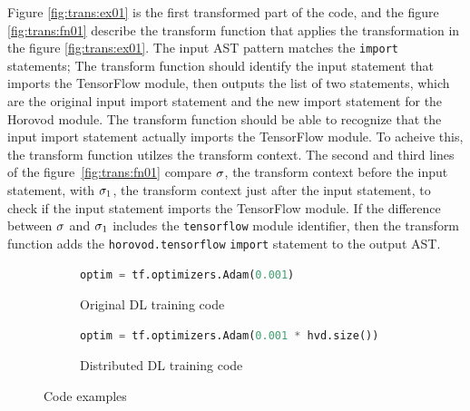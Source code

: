 Figure \ref{fig:trans:ex01} is the first transformed part of the code, and
the figure \ref{fig:trans:fn01} describe the transform function that
applies the transformation in the figure \ref{fig:trans:ex01}.
The input AST pattern matches the {\tt import} statements; 
The transform function should identify the input statement that imports 
the TensorFlow module, then outputs the list of two statements, 
which are the original input import statement and the new import statement 
for the Horovod module. 
The transform function should be able to recognize that the input import
statement actually imports the TensorFlow module.
To acheive this, the transform function utilzes the transform context.
The second and third lines of the figure~\ref{fig:trans:fn01}
compare $\sigma$, the transform context
before the input statement, with $\sigma_{1}$, the transform context
just after the input statement, to check if the input statement
imports the TensorFlow module.  
If the difference between $\sigma$ and $\sigma_{1}$ includes the
{\tt tensorflow} module identifier,
then the transform function adds the {\tt horovod.tensorflow} {\tt import} 
statement to the output AST.

\pagebreak
\begin{figure}[ht!]
  \centering
  \begin{subfigure}[t]{0.48\textwidth}
    \begin{lstlisting}[language=Python]
optim = tf.optimizers.Adam(0.001)\end{lstlisting}
    \caption{Original DL training code}
  \end{subfigure}
  \hspace{5mm}
  \begin{subfigure}[t]{0.48\textwidth}
    \begin{lstlisting}[language=Python]
optim = tf.optimizers.Adam(0.001 * hvd.size())\end{lstlisting}
    \caption{Distributed DL training code}
  \end{subfigure}
  \caption{Code examples}
  \label{fig:trans:ex02}
\end{figure}

